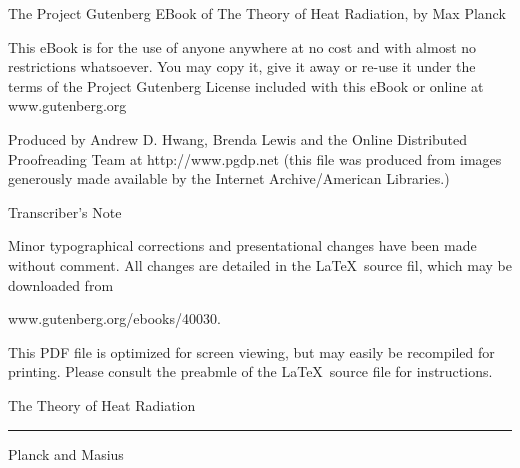 \documentclass[12pt,oneside]{book}
\begin{document}
    
\frontmatter

The Project Gutenberg EBook of The Theory of Heat Radiation, by Max Planck \par 

This eBook is for the use of anyone anywhere at no cost and with almost no restrictions whatsoever. You may copy it, give it away or re-use it under the terms of the Project
Gutenberg License included with this eBook or online at www.gutenberg.org \par 

\pagebreak

Produced by Andrew D. Hwang, Brenda Lewis and the Online Distributed Proofreading Team at http://www.pgdp.net (this file was produced from images generously made available
by the Internet Archive/American Libraries.) \par 

\vfill 

\begin{center}
    Transcriber's Note
\end{center}
Minor typographical corrections and presentational changes have been made without comment. All changes are detailed in the \LaTeX\ source fil, which may be downloaded from 
\begin{center}
    www.gutenberg.org/ebooks/40030. \par 
\end{center}
This PDF file is optimized for screen viewing, but may easily be recompiled for printing. Please consult the preabmle of the \LaTeX\ source file for instructions. \par 
\begin{titlepage}
    \centering
    \vspace*{6cm}
    {\Huge The Theory of Heat Radiation \par}
    \vspace{12pt}
    \noindent\rule{7cm}{0.4pt} \par 
    \vspace{12pt}
    {\huge Planck and Masius} \par 
\end{titlepage}

    
\end{document}
